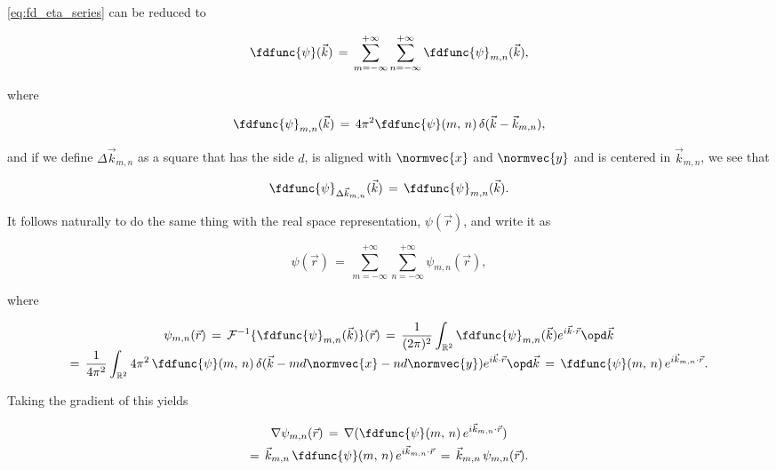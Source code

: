 \eqref{eq:fd_eta_series} can be reduced to

\begin{equation} \label{eq:fd_eta_series_reduced}
\fdfunc{\psi}(\vec{k}) \,=\, \sum_{m=-\infty}^{+\infty}\sum_{n=-\infty}^{+\infty} \fdfunc{\psi}_{m,n}(\vec{k}),
\end{equation}

where

\begin{equation} \label{eq:fd_eta_mn_definition}
\fdfunc{\psi}_{m,n}(\vec{k}) \,=\, 4\pi^2 \fdfunc{\psi}(m,\,n)\,\delta(\vec{k} - \vec{k}_{m,n}),
\end{equation}

and if we define $\Delta\vec{k}_{m,n}$ as a square that has the side $d$, is aligned with $\normvec{x}$ and $\normvec{y}$ and is centered in $\vec{k}_{m,n}$, we see that

\begin{equation} \label{eq:fd_eta_dk_mn_definition}
\fdfunc{\psi}_{\Delta\vec{k}_{m,n}}(\vec{k}) \,=\, \fdfunc{\psi}_{m,n}(\vec{k}).
\end{equation}

It follows naturally to do the same thing with the real space representation, $\psi(\vec{r})$, and write it as

\begin{equation} \label{eq:eta_series_reduced}
\psi(\vec{r}) \,=\, \sum_{m=-\infty}^{+\infty}\sum_{n=-\infty}^{+\infty} \psi_{m,n}(\vec{r}),
\end{equation}

where

\begin{equation} \label{eq:eta_mn_definition}
\renewcommand*{\arraystretch}{1.5}
\begin{array}{c}
\displaystyle \psi_{m,n}(\vec{r}) \,=\, \mathcal{F}^{-1}\{\fdfunc{\psi}_{m,n}(\vec{k})\}(\vec{r}) \,=\, \frac{1}{(2\pi)^2} \int_{\mathbb{R}^2} \fdfunc{\psi}_{m,n}(\vec{k}) e^{i\vec{k}\cdot\vec{r}}\opd \vec{k} \\
\displaystyle =\, \frac{1}{4\pi^2} \int_{\mathbb{R}^2} 4\pi^2\,\fdfunc{\psi}(m,\,n)\,\delta(\vec{k} - md\normvec{x} - nd\normvec{y}) e^{i\vec{k}\cdot\vec{r}}\opd \vec{k} \,=\, \fdfunc{\psi}(m,\,n)\,e^{i\vec{k}_{m,n}\cdot\vec{r}}.
\end{array}
\end{equation}

Taking the gradient of this yields

\begin{equation} \label{eq:grad_eta_one_dirac}
\renewcommand*{\arraystretch}{1.5}
\begin{array}{c}
\displaystyle \nabla\psi_{m,n}(\vec{r}) \,=\, \nabla(\fdfunc{\psi}(m,\,n)\,e^{i\vec{k}_{m,n}\cdot\vec{r}}) \\
\displaystyle =\, \vec{k}_{m,n}\,\fdfunc{\psi}(m,\,n)\,e^{i\vec{k}_{m,n}\cdot\vec{r}} \,=\, \vec{k}_{m,n}\,\psi_{m,n}(\vec{r}).
\end{array}
\end{equation}

